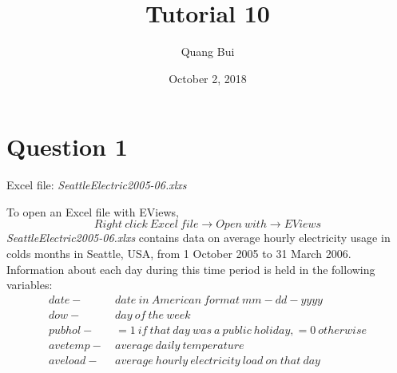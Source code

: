 \documentclass[12pt]{report}
\title{Tutorial 10}
\subtitle
{
	\textbf{keywords}: time series, serial correlation, Breusch-Godfrey test, errors, residuals, dummy variables
	
	\textbf{estimated reading time}: 37 minutes
}
\author{Quang Bui}
\date{October 2, 2018}
\begin{document}
	
\maketitle

\section*{Question 1}
\noindent Excel file: \textit{SeattleElectric2005-06.xlxs} 

\noindent To open an Excel file with EViews,
$$Right\ click\ Excel\ file \to Open\ with \to EViews$$
\noindent \textit{SeattleElectric2005-06.xlxs} contains data on average hourly electricity usage in colds months in Seattle, USA, from 1 October 2005 to 31 March 2006. Information about each day during this time period is held in the following variables:
\begin{align*}
	date-&\ date\ in\ American\ format\ mm-dd-yyyy \\
	dow-&\ day\ of\ the\ week \\
	pubhol-&\ =1\ if\ that\ day\ was\ a\ public\ holiday, =0\ otherwise \\
	avetemp-&\ average\ daily\ temperature \\
	aveload-&\ average\ hourly\ electricity\ load\ on\ that\ day
\end{align*}
\vspace{-\baselineskip}
\end{document}
